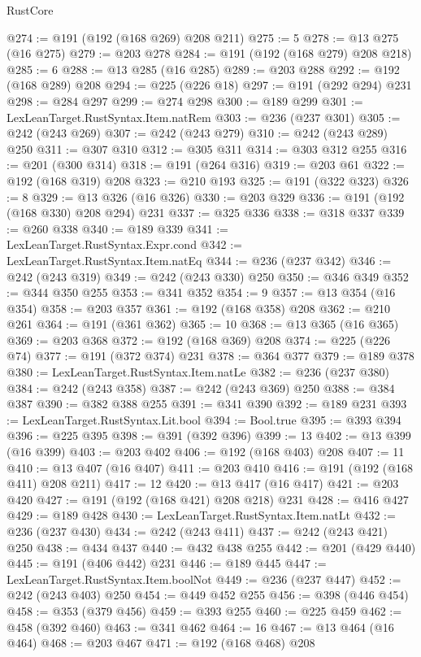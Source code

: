 \begin{lexlean}{RustCore}
\begin{coremodule}
@274 := @191 (@192 (@168 @269) @208 @211)
@275 := 5
@278 := @13 @275 (@16 @275)
@279 := @203 @278
@284 := @191 (@192 (@168 @279) @208 @218)
@285 := 6
@288 := @13 @285 (@16 @285)
@289 := @203 @288
@292 := @192 (@168 @289) @208
@294 := @225 (@226 @18)
@297 := @191 (@292 @294) @231
@298 := @284 @297
@299 := @274 @298
@300 := @189 @299
@301 := LexLeanTarget.RustSyntax.Item.natRem
@303 := @236 (@237 @301)
@305 := @242 (@243 @269)
@307 := @242 (@243 @279)
@310 := @242 (@243 @289) @250
@311 := @307 @310
@312 := @305 @311
@314 := @303 @312 @255
@316 := @201 (@300 @314)
@318 := @191 (@264 @316)
@319 := @203 @61
@322 := @192 (@168 @319) @208
@323 := @210 @193
@325 := @191 (@322 @323)
@326 := 8
@329 := @13 @326 (@16 @326)
@330 := @203 @329
@336 := @191 (@192 (@168 @330) @208 @294) @231
@337 := @325 @336
@338 := @318 @337
@339 := @260 @338
@340 := @189 @339
@341 := LexLeanTarget.RustSyntax.Expr.cond
@342 := LexLeanTarget.RustSyntax.Item.natEq
@344 := @236 (@237 @342)
@346 := @242 (@243 @319)
@349 := @242 (@243 @330) @250
@350 := @346 @349
@352 := @344 @350 @255
@353 := @341 @352
@354 := 9
@357 := @13 @354 (@16 @354)
@358 := @203 @357
@361 := @192 (@168 @358) @208
@362 := @210 @261
@364 := @191 (@361 @362)
@365 := 10
@368 := @13 @365 (@16 @365)
@369 := @203 @368
@372 := @192 (@168 @369) @208
@374 := @225 (@226 @74)
@377 := @191 (@372 @374) @231
@378 := @364 @377
@379 := @189 @378
@380 := LexLeanTarget.RustSyntax.Item.natLe
@382 := @236 (@237 @380)
@384 := @242 (@243 @358)
@387 := @242 (@243 @369) @250
@388 := @384 @387
@390 := @382 @388 @255
@391 := @341 @390
@392 := @189 @231
@393 := LexLeanTarget.RustSyntax.Lit.bool
@394 := Bool.true
@395 := @393 @394
@396 := @225 @395
@398 := @391 (@392 @396)
@399 := 13
@402 := @13 @399 (@16 @399)
@403 := @203 @402
@406 := @192 (@168 @403) @208
@407 := 11
@410 := @13 @407 (@16 @407)
@411 := @203 @410
@416 := @191 (@192 (@168 @411) @208 @211)
@417 := 12
@420 := @13 @417 (@16 @417)
@421 := @203 @420
@427 := @191 (@192 (@168 @421) @208 @218) @231
@428 := @416 @427
@429 := @189 @428
@430 := LexLeanTarget.RustSyntax.Item.natLt
@432 := @236 (@237 @430)
@434 := @242 (@243 @411)
@437 := @242 (@243 @421) @250
@438 := @434 @437
@440 := @432 @438 @255
@442 := @201 (@429 @440)
@445 := @191 (@406 @442) @231
@446 := @189 @445
@447 := LexLeanTarget.RustSyntax.Item.boolNot
@449 := @236 (@237 @447)
@452 := @242 (@243 @403) @250
@454 := @449 @452 @255
@456 := @398 (@446 @454)
@458 := @353 (@379 @456)
@459 := @393 @255
@460 := @225 @459
@462 := @458 (@392 @460)
@463 := @341 @462
@464 := 16
@467 := @13 @464 (@16 @464)
@468 := @203 @467
@471 := @192 (@168 @468) @208

\end{coremodule}
\end{lexlean}
